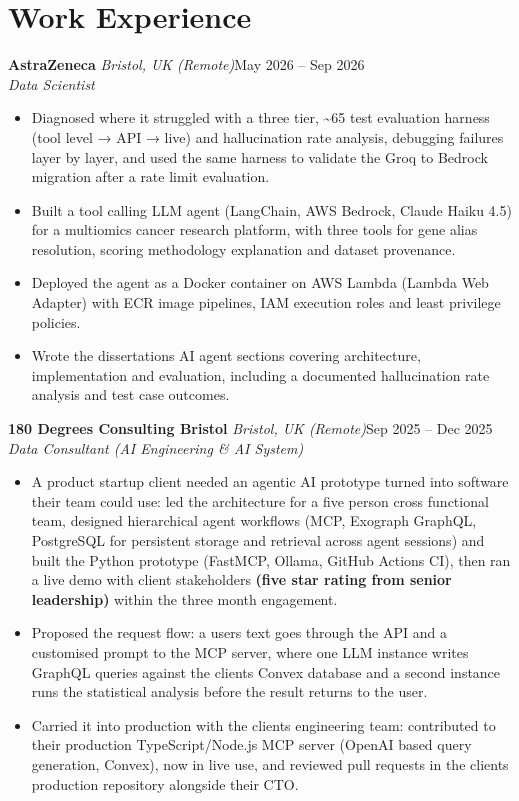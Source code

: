\documentclass[a4paper,11pt]{article}
\newcommand{\role}[4]{%
  \textbf{#1}{\color{muted}\,\textperiodcentered\,\textit{#2}}\hfill{\color{muted}#3}\\
  \textit{#4}\par}
\newcommand{\gap}{\vspace{5pt}}
\newcommand{\num}[1]{\textbf{#1}}   %
\begin{document}
\section{Work Experience}
\role{AstraZeneca}{Bristol, UK (Remote)}{May 2026 – Sep 2026}{Data Scientist}
\begin{itemize}
  \item Diagnosed where it struggled with a three tier, \textasciitilde{}65 test evaluation harness (tool level → API → live) and hallucination rate analysis, debugging failures layer by layer, and used the same harness to validate the Groq to Bedrock migration after a rate limit evaluation.
  \item Built a tool calling LLM agent (LangChain, AWS Bedrock, Claude Haiku 4.5) for a multiomics cancer research platform, with three tools for gene alias resolution, scoring methodology explanation and dataset provenance.
  \item Deployed the agent as a Docker container on AWS Lambda (Lambda Web Adapter) with ECR image pipelines, IAM execution roles and least privilege policies.
  \item Wrote the dissertation\textquotesingle{}s AI agent sections covering architecture, implementation and evaluation, including a documented hallucination rate analysis and test case outcomes.
\end{itemize}
\gap
{}
\role{180 Degrees Consulting Bristol}{Bristol, UK (Remote)}{Sep 2025 – Dec 2025}{Data Consultant (AI Engineering \& AI System)}
\begin{itemize}
  \item A product startup client needed an agentic AI prototype turned into software their team could use: led the architecture for a five person cross functional team, designed hierarchical agent workflows (MCP, Exograph GraphQL, PostgreSQL for persistent storage and retrieval across agent sessions) and built the Python prototype (FastMCP, Ollama, GitHub Actions CI), then ran a live demo with client stakeholders \num{(five star rating from senior leadership)} within the three month engagement.
  \item Proposed the request flow: a user\textquotesingle{}s text goes through the API and a customised prompt to the MCP server, where one LLM instance writes GraphQL queries against the client\textquotesingle{}s Convex database and a second instance runs the statistical analysis before the result returns to the user.
  \item Carried it into production with the client\textquotesingle{}s engineering team: contributed to their production TypeScript/Node.js MCP server (OpenAI based query generation, Convex), now in live use, and reviewed pull requests in the client\textquotesingle{}s production repository alongside their CTO.
\end{itemize}
\end{document}
